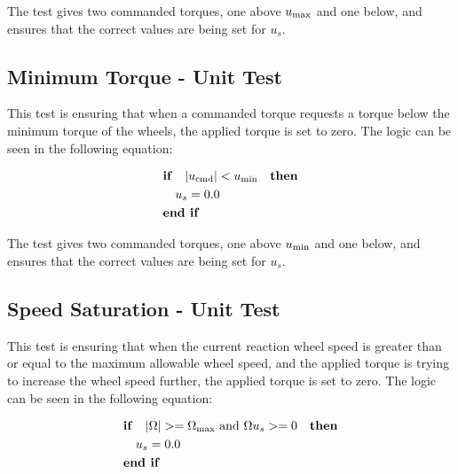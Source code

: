 The test gives two commanded torques, one above $u_{\textnormal{max}}$ and one below, and ensures that the correct values are being set for $u_s$.

\subsection{Minimum Torque - Unit Test}

This test is ensuring that when a commanded torque requests a torque below the minimum torque of the wheels, the applied torque is set to zero. The logic can be seen in the following equation:

\begin{equation}
\begin{gathered}
\begin{aligned}
&\textnormal{\textbf{if}}\quad \vert u_{\textnormal{cmd}} \vert < u_{\textnormal{min}}  \quad \textnormal{\textbf{then}}\\
&\quad u_s = 0.0 \\
&\textnormal{\textbf{end if}}\\
\end{aligned}
\end{gathered}
\label{eq:ballin2}
\end{equation}

The test gives two commanded torques, one above $u_{\textnormal{min}}$ and one below, and ensures that the correct values are being set for $u_s$.

\subsection{Speed Saturation - Unit Test}

This test is ensuring that when the current reaction wheel speed is greater than or equal to the maximum allowable wheel speed, and the applied torque is trying to increase the wheel speed further, the applied torque is set to zero. The logic can be seen in the following equation:

\begin{equation}
\begin{gathered}
\begin{aligned}
&\textnormal{\textbf{if}}\quad \vert \Omega \vert >= \Omega_{\text{max}} \textnormal{ and } \Omega u_s >= 0  \quad \textnormal{\textbf{then}}\\
&\quad u_s = 0.0 \\
&\textnormal{\textbf{end if}}\\
\end{aligned}
\end{gathered}
\label{eq:ballin3}
\end{equation}

